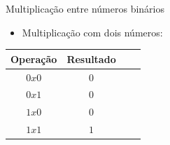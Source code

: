
\begin{frame}{Multiplicação entre números binários}
    \begin{itemize}
        \item Multiplicação com dois números:
    \end{itemize}
    \begin{table}[h]
        \centering
        \begin{tabular}{c|c|c|c}
            \hline
            \textbf{Operação} & \textbf{Resultado} \\
            \hline
            $0 x 0$         & $0$ \\
            $0 x 1$         & $0$ \\
            $1 x 0$         & $0$ \\
            $1 x 1$         & $1$ \\
            \hline
        \end{tabular}
    \end{table}
\end{frame}